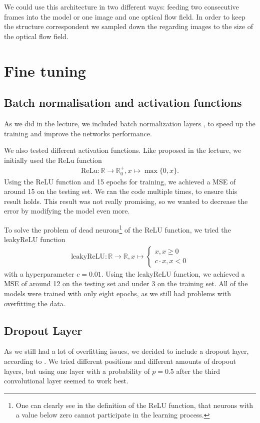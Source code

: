\documentclass[conference]{IEEEtran}
\begin{document}
We could use this architecture in two different ways: feeding two consecutive frames into the model or one image and one optical flow field. In order to keep the structure correspondent we sampled down the regarding images to the size of the optical flow field.

\section{Fine tuning}

\subsection{Batch normalisation and activation functions}
As we did in the lecture, we included batch normalization layers \cite{BatchNorm2015}, to speed up
the training and improve the networks performance.

We also tested different activation functions. Like proposed in the lecture, we initially used the ReLu
function
\begin{align*}
\mathrm{ReLu}: \mathbb{R} \to \mathbb{R}_0^+, x \mapsto \max\{0,x\}.
\end{align*}
Using the ReLU function and 15 epochs for training, we achieved a MSE of around 15 on the 
testing set. We ran the code multiple times, to ensure this result holds. This result was not really 
promising, so we wanted to decrease the error by modifying the model even more.

To solve the problem of dead neurons\footnote{One can clearly see in the definition of the ReLU 
function, that neurons with a value below zero cannot participate in the learning process.} of the ReLU function, we 
tried the leakyReLU function
\begin{align*}
\mathrm{leakyReLU} : \mathbb{R} \to \mathbb{R}, x \mapsto \begin{cases}
x, x \geq 0\\
c \cdot x, x <0
\end{cases}
\end{align*}
with a hyperparameter $c = 0.01$. Using the leakyReLU function, we achieved a MSE of around 12 on the 
testing set and under 3 on the training set. All of the models were trained with only eight epochs, as 
we still had problems with overfitting the data.

\subsection{Dropout Layer}
As we still had a lot of overfitting issues, we decided to include a dropout layer, according to 
\cite{Dropout2014}. We tried different positions and different amounts of dropout layers, but using one 
layer with a probability of $p=0.5$ after the third convolutional layer seemed to work best.
\end{document}
